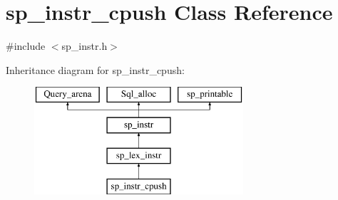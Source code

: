 \hypertarget{classsp__instr__cpush}{}\section{sp\+\_\+instr\+\_\+cpush Class Reference}
\label{classsp__instr__cpush}


{\ttfamily \#include $<$sp\+\_\+instr.\+h$>$}

Inheritance diagram for sp\+\_\+instr\+\_\+cpush\+:\begin{figure}[H]
\begin{center}
\leavevmode
\includegraphics[height=4.000000cm]{classsp__instr__cpush}
\end{center}
\end{figure}
